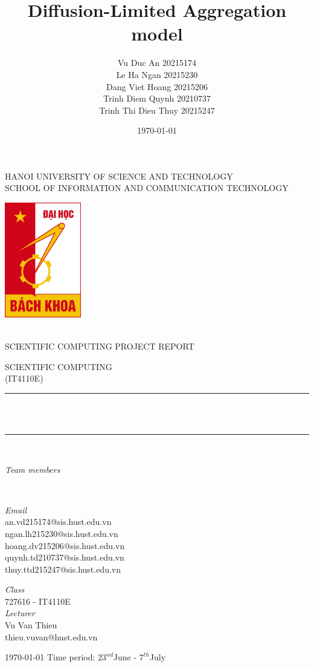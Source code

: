 \documentclass[a4paper,10pt,notitlepage]{article}
\title{Diffusion-Limited Aggregation model}
\author{{Vu Duc An 20215174}
\\ {Le Ha Ngan 20215230}
\\ {Dang Viet Hoang 20215206}
\\ {Trinh Diem Quynh 20210737}
\\ {Trinh Thi Dieu Thuy 20215247}}
\date{\today}
\makeatletter
\newcommand{\mails}{ {an.vd215174@sis.hust.edu.vn}
\\ {ngan.lh215230@sis.hust.edu.vn}
\\ {hoang.dv215206@sis.hust.edu.vn}
\\ {quynh.td210737@sis.hust.edu.vn}
\\ {thuy.ttd215247@sis.hust.edu.vn}}
\newcommand{\class}{727616 - IT4110E}
\newcommand{\lecturer}{{Vu Van Thieu}
\\thieu.vuvan@hust.edu.vn
}
\makeatother
\begin{document}
 \raggedright
\NoBgThispage
\thispagestyle{empty}

	\newcommand{\HRule}{\rule{\linewidth}{0.3mm}} 
	\center 
	\MakeUppercase{\large Hanoi University of Science and Technology
	\\ \LARGE School of Information and Communication Technology}\\[0.5cm]
		{\includegraphics[width=0.25\textwidth]{hustlogo.png} \par}\\[0.5cm]
	\textsc	{\MakeUppercase{\Large Scientific Computing project report}\\[0.75cm]}
	
	\textsc	{\MakeUppercase{\large Scientific Computing\\\normalsize (IT4110E)}\\[0.5cm]}
	
	\HRule\\[0.4cm]

	{\huge\bfseries \@title}\\[0.4cm]
	
	\HRule\\[1.5cm]
	\begin{minipage}{0.4\textwidth}
		\begin{flushleft}
			\large
			\textit{Team members}\\
			\@author
		\end{flushleft}
	\end{minipage}
	~
	\begin{minipage}{0.4\textwidth}
		\begin{flushright}
			\large
			\textit{Email}\\
			\mails 
		\end{flushright}
	\end{minipage}
\vfill\vfill
        \begin{minipage}{0.4\textwidth}
		\begin{center}
			\large
			\textit{Class}\\
			\class\\
			\textit{Lecturer}\\
			\lecturer\\
		\end{center}
	\end{minipage}
\vfill\vfill
		{\large\today} 
    \vfill\vfill
    \normalsize{Time period: $23^{nd}$June - $7^{th}$July}
    \\[0.3cm]
   
\end{document}
